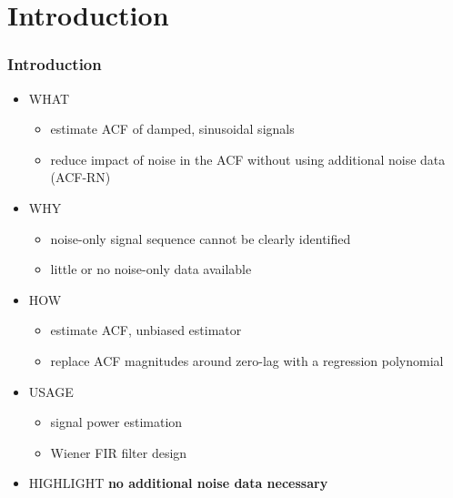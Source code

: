 \documentclass[11pt,aspectratio=169]{beamer}
\begin{document}
	\section{Introduction}
	\begin{frame}
		\frametitle{Introduction}
		\begin{itemize}
			\item \textcolor{RIPtitlecol}{WHAT}
			\begin{itemize}
				\item estimate ACF of damped, sinusoidal signals
				\item reduce impact of noise in the ACF without using additional noise data (ACF-RN)
			\end{itemize}
			\item \textcolor{RIPtitlecol}{WHY}
			\begin{itemize}
				\item noise-only signal sequence cannot be clearly identified
				\item little or no noise-only data available
			\end{itemize}
			\item \textcolor{RIPtitlecol}{HOW}
			\begin{itemize}
				\item estimate ACF, unbiased estimator
				\item replace ACF magnitudes around zero-lag with a regression polynomial
			\end{itemize}
			\item \textcolor{RIPtitlecol}{USAGE}
				\begin{itemize}
					\item signal power estimation
					\item Wiener FIR filter design
				\end{itemize}
			\item \textcolor{RIPtitlecol}{HIGHLIGHT} \textbf{no additional noise data necessary}
		\end{itemize}
	\end{frame}
\end{document}
